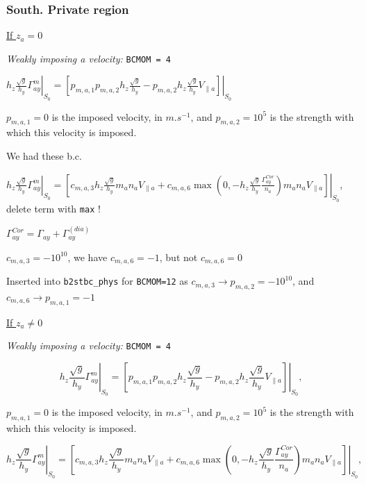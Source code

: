 \documentclass[a4paper,10pt]{report}
\begin{document}
\subsubsection{South. Private region}

\underline{If $z_a = 0$}

{\em Weakly imposing a velocity:} {\tt BCMOM = 4}

$\left. h_z \frac{\sqrt g}{h_y} \Gamma_{ay}^m \right|_{S_0} =
\left. \left[
p_{m,a,1} p_{m,a,2} h_z \frac{\sqrt g}{h_y} -
p_{m,a,2} h_z \frac{\sqrt g}{h_y} V_{\parallel a}
\right] \right|_{S_0}$

$p_{m,a,1}=0$ is the imposed velocity, in $m.s^{-1}$, and $p_{m,a,2}=10^5$ is the strength with which this velocity is imposed.

We had these b.c.

$\left. h_z \frac{\sqrt g}{h_y} \Gamma_{ay}^m \right|_{S_0} =
\left. \left[
c_{m,a,3} h_z \frac{\sqrt g}{h_y} m_a n_a V_{\parallel a} +
c_{m,a,6} \max \left(0,-h_z \frac{\sqrt g}{h_y} \frac{\Gamma_{ay}^{Cor}}{n_a} \right)
m_a n_a V_{\parallel a}
\right] \right|_{S_0}$, delete term with {\tt max} !


$\Gamma_{ay}^{Cor} = \Gamma_{ay} + \Gamma_{ay}^{(dia)}$

$c_{m,a,3} = -10^{10}$, we have $c_{m,a,6}=-1$, but not $c_{m,a,6}=0$

Inserted into {\tt b2stbc\_phys} for {\tt BCMOM=12} as $c_{m,a,3} \rightarrow p_{m,a,2} = -10^{10}$, and $c_{m,a,6} \rightarrow p_{m,a,1} = -1$

\underline{If $z_a \neq 0$}

{\em Weakly imposing a velocity:} {\tt BCMOM = 4}

\begin{equation}
\left. h_z \frac{\sqrt g}{h_y} \Gamma_{ay}^m \right|_{S_0} =
\left. \left[
	p_{m,a,1} p_{m,a,2} h_z \frac{\sqrt g}{h_y} -
	p_{m,a,2} h_z \frac{\sqrt g}{h_y} V_{\parallel a}
\right] \right|_{S_0},
\end{equation}

$p_{m,a,1}=0$ is the imposed velocity, in $m.s^{-1}$, and $p_{m,a,2}=10^5$ is the strength with which this velocity is imposed.

\begin{equation}
\left. h_z \frac{\sqrt g}{h_y} \Gamma_{ay}^m \right|_{S_0} =
\left. \left[
	c_{m,a,3} h_z \frac{\sqrt g}{h_y} m_a n_a V_{\parallel a} +
	c_{m,a,6} \max \left(
		0, -h_z \frac{\sqrt g}{h_y} \frac{\Gamma_{ay}^{Cor}}{n_a}
	\right) m_a n_a V_{\parallel a}
\right] \right|_{S_0},
\end{equation}
\end{document}
